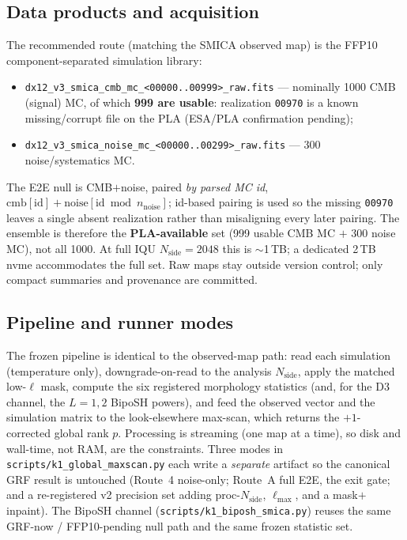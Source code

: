 \documentclass[11pt]{article}
\newcommand{\code}[1]{\texttt{\small #1}}
\begin{document}
\subsection{Data products and acquisition}
The recommended route (matching the SMICA observed map) is the FFP10
component-separated simulation library:
\begin{itemize}
\item \code{dx12\_v3\_smica\_cmb\_mc\_<00000..00999>\_raw.fits} --- nominally 1000 CMB
(signal) MC, of which \textbf{999 are usable}: realization \code{00970} is a known
missing/corrupt file on the PLA (ESA/PLA confirmation pending);
\item \code{dx12\_v3\_smica\_noise\_mc\_<00000..00299>\_raw.fits} --- 300 noise/systematics MC.
\end{itemize}
The E2E null is CMB$+$noise, paired \emph{by parsed MC id},
$\mathrm{cmb}[\mathrm{id}]+\mathrm{noise}[\mathrm{id}\bmod n_{\mathrm{noise}}]$;
id-based pairing is used so the missing \code{00970} leaves a single absent
realization rather than misaligning every later pairing. The ensemble is
therefore the \textbf{PLA-available} set (999 usable CMB MC $+$ 300 noise MC),
not all 1000. At full IQU $N_{\mathrm{side}}=2048$ this is $\sim$1\,TB; a
dedicated 2\,TB nvme accommodates the full set. Raw maps stay outside version
control; only compact summaries and provenance are committed.

\subsection{Pipeline and runner modes}
The frozen pipeline is identical to the observed-map path: read each simulation
(temperature only), downgrade-on-read to the analysis $N_{\mathrm{side}}$, apply
the matched low-$\ell$ mask, compute the six registered morphology statistics
(and, for the D3 channel, the $L{=}1,2$ BipoSH powers), and feed the observed
vector and the simulation matrix to the look-elsewhere max-scan, which returns
the $+1$-corrected global rank $p$. Processing is streaming (one map at a time),
so disk and wall-time, not RAM, are the constraints. Three modes in
\code{scripts/k1\_global\_maxscan.py} each write a \emph{separate} artifact so
the canonical GRF result is untouched (Route~4 noise-only; Route~A full E2E, the
exit gate; and a re-registered v2 precision set adding proc-$N_{\mathrm{side}}$,
$\ell_{\max}$, and a mask$+$inpaint). The BipoSH channel
(\code{scripts/k1\_biposh\_smica.py}) reuses the same GRF-now / FFP10-pending
null path and the same frozen statistic set.
\end{document}
